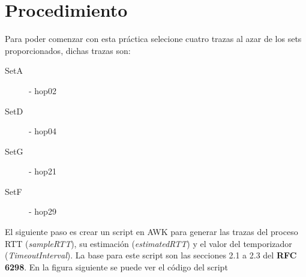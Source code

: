 
\section*{Procedimiento}

\noindent Para poder comenzar con esta pr\'actica selecione cuatro trazas al azar de los sets proporcionados,
 dichas trazas son:

\begin{description}
    \item[SetA] - hop02
    \item[SetD] - hop04
    \item[SetG] - hop21
    \item[SetF] - hop29 
\end{description}

\noindent El siguiente paso es crear un script en AWK para generar las trazas del proceso RTT (\emph{sampleRTT}),
su estimaci\'on (\emph{estimatedRTT}) y el valor del temporizador (\emph{TimeoutInterval}). La base para este script 
son las secciones 2.1 a 2.3 del \textbf{RFC 6298}. En la figura siguiente se puede ver el c\'odigo del script


